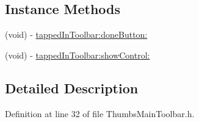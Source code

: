 \subsection*{Instance Methods}
\begin{DoxyCompactItemize}
\item 
(void) -\/ \hyperlink{protocol_thumbs_main_toolbar_delegate-p_a0a1f15eccee494d202ee8b4bc99633db}{tapped\-In\-Toolbar\-:done\-Button\-:}
\item 
(void) -\/ \hyperlink{protocol_thumbs_main_toolbar_delegate-p_a2b192075116f44d678a6bfc923086bd7}{tapped\-In\-Toolbar\-:show\-Control\-:}
\end{DoxyCompactItemize}


\subsection{Detailed Description}


Definition at line 32 of file Thumbs\-Main\-Toolbar.\-h.



